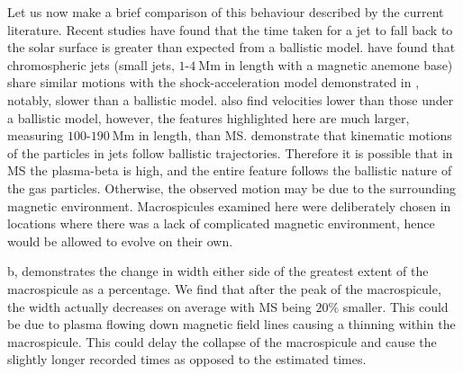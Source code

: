 Let us now make a brief comparison of this behaviour described by the current literature. Recent studies have found that the time taken for a jet to fall back to the solar surface is greater than expected from a ballistic model. \cite{Nishizuka2011} have found that chromospheric jets (small jets, $1$-$4\ \textrm{Mm}$ in length with a magnetic anemone base) share similar motions with the shock-acceleration model demonstrated in \cite{ShibataSuematsu1982}, notably, slower than a ballistic model. \cite{Moschou2013} also find velocities lower than those under a ballistic model, however, the features highlighted here are much larger, measuring $100$-$190\ \textrm{Mm}$ in length, than MS. \cite{Feng2012} demonstrate that kinematic motions of the particles in jets follow ballistic trajectories. Therefore it is possible that in MS the plasma-beta is high, and the entire feature follows the ballistic nature of the gas particles. Otherwise, the observed motion may be due to the surrounding magnetic environment. Macrospicules examined here were deliberately chosen in locations where there was a lack of complicated magnetic environment, hence would be allowed to evolve on their own.



b, demonstrates the change in width either side of the greatest extent of the macrospicule as a percentage. We find that after the peak of the macrospicule, the width actually decreases on average with MS being $20\%$ smaller. This could be due to plasma flowing down magnetic field lines causing a thinning within the macrospicule. This could delay the collapse of the macrospicule and cause the slightly longer recorded times as opposed to the estimated times.       

